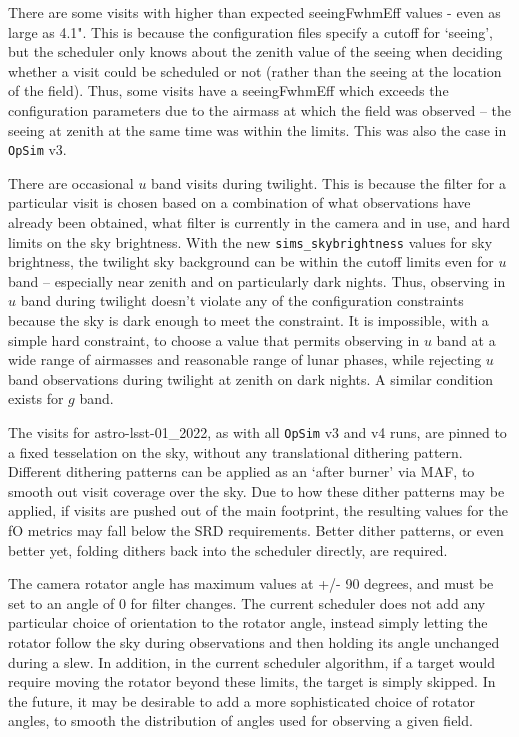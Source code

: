 \documentclass[DM,authoryear,toc]{lsstdoc}
\newcommand{\opsim}{\texttt{OpSim}\xspace}
\newcommand{\simsky}{\texttt{sims\_skybrightness}\xspace}
\begin{document}
There are some visits with higher than expected seeingFwhmEff values - even as large as 4.1". This is because the configuration files specify a cutoff for `seeing', but the scheduler only knows about the zenith value of the seeing when deciding whether a visit could be scheduled or not (rather than the seeing at the location of the field). Thus, some visits have a seeingFwhmEff which exceeds the configuration parameters due to the airmass at which the field was observed -- the seeing at zenith at the same time was within the limits. This was also the case in \opsim v3. 

There are occasional $u$ band visits during twilight. This is because the filter for a particular visit is chosen based on a combination of what observations have already been obtained, what filter is currently in the camera and in use, and hard limits on the sky brightness. With the new \simsky values for sky brightness, the twilight sky background can be within the cutoff limits even for $u$ band -- especially near zenith and on particularly dark nights. Thus, observing in $u$ band during twilight doesn't violate any of the configuration constraints because the sky is dark enough to meet the constraint. It is impossible, with a simple hard constraint, to choose a value that permits observing in $u$ band at a wide range of airmasses and reasonable range of lunar phases, while rejecting $u$ band observations during twilight at zenith on dark nights. A similar condition exists for $g$ band.

The visits for astro-lsst-01\_2022, as with all \opsim v3 and v4 runs, are pinned to a fixed tesselation on the sky, without any translational dithering pattern. Different dithering patterns can be applied as an `after burner' via MAF, to smooth out visit coverage over the sky. Due to how these dither patterns may be applied, if visits are pushed out of the main footprint, the resulting values for the fO metrics may fall below the SRD requirements. Better dither patterns, or even better yet, folding dithers back into the scheduler directly, are required.

The camera rotator angle has maximum values at +/- 90 degrees, and must be set to an angle of 0 for filter changes. The current scheduler does not add any particular choice of orientation to the rotator angle, instead simply letting the rotator follow the sky during observations and then holding its angle unchanged during a slew. In addition, in the current scheduler algorithm, if a target would require moving the rotator beyond these limits, the target is simply skipped. In the future, it may be desirable to add a more sophisticated choice of rotator angles, to smooth the distribution of angles used for observing a given field.
\end{document}
